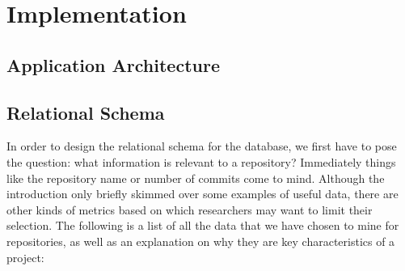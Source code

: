 \chapter{Implementation}

\section{Application Architecture}

\newpage
\section{Relational Schema}

In order to design the relational schema for the database, we first have to pose the question: what information is relevant to a repository?
Immediately things like the repository name or number of commits come to mind.
Although the introduction only briefly skimmed over some examples of useful data, there are other kinds of metrics based on which researchers may want to limit their selection.
The following is a list of all the data that we have chosen to mine for repositories, as well as an explanation on why they are key characteristics of a project:
